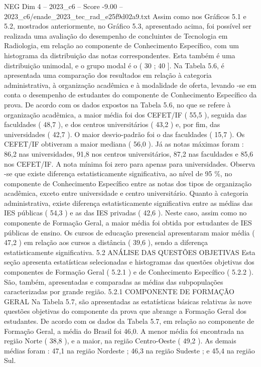 \begin{textsample}{NEG Dim 4 – 2023\_c6 – Score -9.00 – 2023\_c6/enade\_2023\_tec\_rad\_e25f9d02a9.txt}
Assim como nos Gráficos 5.1 e 5.2, mostrados anteriormente, no Gráfico 5.3, apresentado acima, foi possível ser realizada uma avaliação do desempenho de concluintes de Tecnologia em Radiologia, em relação ao componente de Conhecimento Específico, com um histograma da distribuição das notas correspondentes.
Esta também é uma distribuição unimodal, e o grupo modal é o ( 30 ; 40 ].
Na Tabela 5.6, é apresentada uma comparação dos resultados em relação à categoria administrativa, à organização acadêmica e à modalidade de oferta, levando -se em conta o desempenho de estudantes do componente de Conhecimento Específico da prova.
De acordo com os dados expostos na Tabela 5.6, no que se refere à organização acadêmica, a maior média foi dos CEFET/IF ( 55,5 ), seguida das faculdades ( 48,7 ), e dos centros universitários ( 43,2 ) e, por fim, das universidades ( 42,7 ).
O maior desvio-padrão foi o das faculdades ( 15,7 ).
Os CEFET/IF obtiveram a maior mediana ( 56,0 ).
Já as notas máximas foram : 86,2 nas universidades, 91,8 nos centros universitários, 87,2 nas faculdades e 85,6 nos CEFET/IF.
A nota mínima foi zero para apenas para universidades.
Observa -se que existe diferença estatisticamente significativa, ao nível de 95 \%, no componente de Conhecimento Específico entre as notas dos tipos de organização acadêmica, exceto entre universidade e centro universitário.
Quanto à categoria administrativa, existe diferença estatisticamente significativa entre as médias das IES públicas ( 54,3 ) e as das IES privadas ( 42,6 ).
Neste caso, assim como no componente de Formação Geral, a maior média foi obtida por estudantes de IES públicas de ensino.
Os cursos de educação presencial apresentaram maior média ( 47,2 ) em relação aos cursos a distância ( 39,6 ), sendo a diferença estatisticamente significativa. 5.2 ANÁLISE DAS QUESTÕES OBJETIVAS Esta seção apresenta estatísticas selecionadas e histogramas das questões objetivas dos componentes de Formação Geral ( 5.2.1 ) e de Conhecimento Específico ( 5.2.2 ).
São, também, apresentadas e comparadas as médias das subpopulações caracterizadas por grande região. 5.2.1 COMPONENTE DE FORMAÇÃO GERAL Na Tabela 5.7, são apresentadas as estatísticas básicas relativas às nove questões objetivas do componente da prova que abrange a Formação Geral dos estudantes.
De acordo com os dados da Tabela 5.7, em relação ao componente de Formação Geral, a média do Brasil foi 46,0.
A menor média foi encontrada na região Norte ( 38,8 ), e a maior, na região Centro-Oeste ( 49,2 ).
As demais médias foram : 47,1 na região Nordeste ; 46,3 na região Sudeste ; e 45,4 na região Sul.

\end{textsample}
